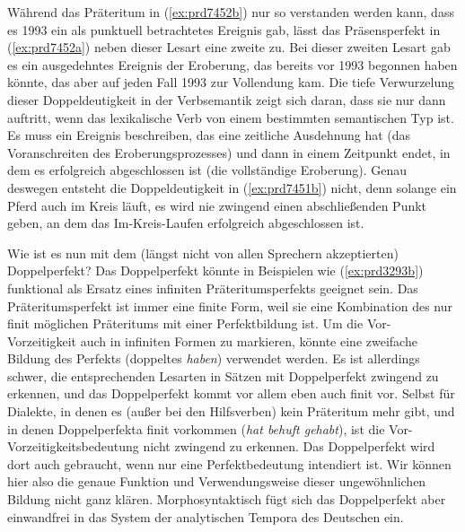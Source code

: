 \begin{exe}
  \ex\label{ex:prd7452} 
  \begin{xlist}
  \end{xlist}
\end{exe}

\label{abs:perfektsem}Während das Präteritum in (\ref{ex:prd7452b}) nur so verstanden werden kann, dass es 1993 ein als punktuell betrachtetes Ereignis gab, lässt das Präsensperfekt in (\ref{ex:prd7452a}) neben dieser Lesart eine zweite zu.
Bei dieser zweiten Lesart gab es ein ausgedehntes Ereignis der Eroberung, das bereits vor 1993 begonnen haben könnte, das aber auf jeden Fall 1993 zur Vollendung kam.
Die tiefe Verwurzelung dieser Doppeldeutigkeit in der Verbsemantik zeigt sich daran, dass sie nur dann auftritt, wenn das lexikalische Verb von einem bestimmten semantischen Typ ist.
Es muss ein Ereignis beschreiben, das eine zeitliche Ausdehnung hat (\zB das Voranschreiten des Eroberungsprozesses) und dann in einem Zeitpunkt endet, in dem es erfolgreich abgeschlossen ist (die vollständige Eroberung).
Genau deswegen entsteht die Doppeldeutigkeit in (\ref{ex:prd7451b}) nicht, denn solange ein Pferd auch im Kreis läuft, es wird nie zwingend einen abschließenden Punkt geben, an dem das Im-Kreis-Laufen erfolgreich abgeschlossen ist.

Wie ist es nun mit dem (längst nicht von allen Sprechern akzeptierten) Doppelperfekt?
Das Doppelperfekt könnte in Beispielen wie (\ref{ex:prd3293b}) funktional als Ersatz eines infiniten Präteritumsperfekts geeignet sein.
Das Präteritumsperfekt ist immer eine finite Form, weil sie eine Kombination des nur finit möglichen Präteritums mit einer Perfektbildung ist.
Um die Vor-Vorzeitigkeit auch in infiniten Formen zu markieren, könnte eine zweifache Bildung des Perfekts (doppeltes \textit{haben}) verwendet werden.
Es ist allerdings schwer, die entsprechenden Lesarten in Sätzen mit Doppelperfekt zwingend zu erkennen, und das Doppelperfekt kommt vor allem eben auch finit vor.
Selbst für Dialekte, in denen es (außer bei den Hilfsverben) kein Präteritum mehr gibt, und in denen Doppelperfekta finit vorkommen (\textit{hat behuft gehabt}), ist die Vor-Vorzeitigkeitsbedeutung nicht zwingend zu erkennen.
Das Doppelperfekt wird dort auch gebraucht, wenn nur eine Perfektbedeutung intendiert ist.
Wir können hier also die genaue Funktion und Verwendungsweise dieser ungewöhnlichen Bildung nicht ganz klären.
Morphosyntaktisch fügt sich das Doppelperfekt aber einwandfrei in das System der analytischen Tempora des Deutschen ein.

